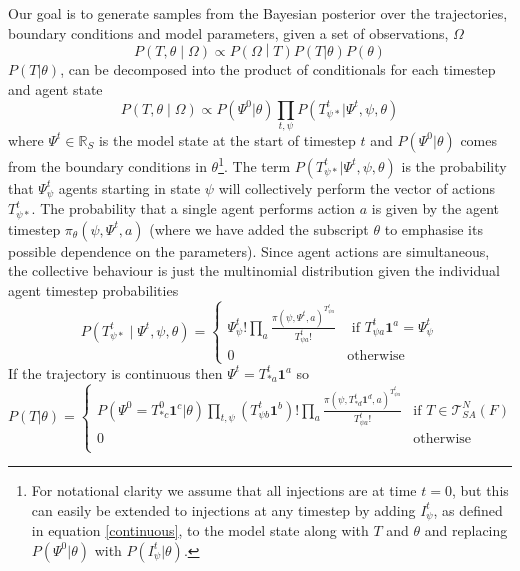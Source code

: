 \documentclass{article}
\begin{document}
Our goal is to generate samples from the Bayesian posterior over the trajectories, boundary conditions and model parameters, given a set of observations, $\Omega$
\[
P\left(T,\theta \middle| \Omega\right) \propto P\left(\Omega \middle| T\right)P(T|\theta)P(\theta)
\]
$P(T|\theta)$, can be decomposed into the product of conditionals for each timestep and agent state
\[
P\left(T,\theta \middle| \Omega\right) \propto  P(\Psi^0|\theta) \prod_{t,\psi} P(T^t_{\psi *} | \Psi^t,\psi,\theta)
\]
where $\Psi^t\in\mathbb{R}_S$ is the model state at the start of timestep $t$ and $P(\Psi^0|\theta)$ comes from the boundary conditions in $\theta$\footnote{For notational clarity we assume that all injections are at time $t=0$, but this can easily be extended to injections at any timestep by adding $I^t_\psi$, as defined in equation \eqref{continuous}, to the model state along with $T$ and $\theta$ and replacing $P(\Psi^0|\theta)$ with $P(I^t_\psi|\theta)$.}.  The term $P(T^t_{\psi *} | \Psi^t,\psi,\theta)$ is the probability that $\Psi^t_\psi$ agents starting in state $\psi$ will collectively perform the vector of actions $T^t_{\psi *}$. The probability that a single agent performs action $a$ is given by the agent timestep $\pi_\theta(\psi,\Psi^t,a)$ (where we have added the subscript $\theta$ to emphasise its possible dependence on the parameters). Since agent actions are simultaneous, the collective behaviour is just the multinomial distribution given the individual agent timestep probabilities
\begin{equation}
P\left(T^t_{\psi *} \mid \Psi^t, \psi, \theta\right) = 
\begin{cases}
\Psi^t_\psi!\prod_a \frac{\pi(\psi,\Psi^t,a)^{T^t_{\psi a}}}{T^t_{\psi a}!} & \text{ if } T^t_{\psi a}\mathbf{1}^a = \Psi^t_\psi \\
0 & \text{otherwise}
\end{cases}
\end{equation}
If the trajectory is continuous then $\Psi^t = T^t_{* a}\mathbf{1}^a$ so 
\begin{equation}
P(T|\theta) =
\begin{cases}
P(\Psi^0 = T^0_{* c}\mathbf{1}^c|\theta)
\prod_{t, \psi} \left(T^t_{\psi b} \mathbf{1}^b \right)!
\prod_{a} \frac{\pi(\psi, T^{t}_{* d}\mathbf{1}^d,a)^{T^{t}_{\psi a}}}{T^{t}_{\psi a}!} & \text{if } T \in \mathcal{T}^N_{SA}(F) \\
0 & \text{otherwise}\\
\end{cases}
\label{priorTrajectory}
\end{equation}
\end{document}
